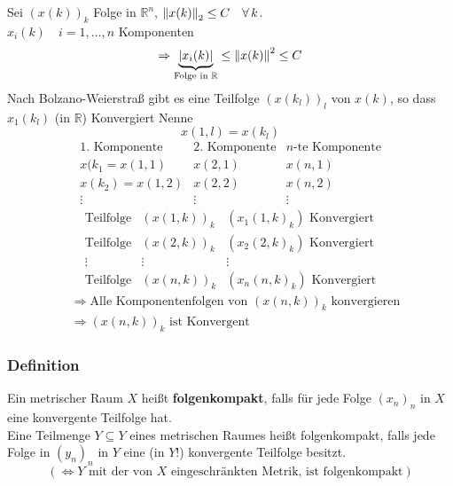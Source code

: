 Sei $(x(k))_k$ Folge in $\mathbb{R}^n$, $\norm{x(k)}_2 \leq C \quad  \forall\, k$. \\
$x_i(k) \quad  i=1,\dots,n$ Komponenten
\[
	\Rightarrow \underset{\text{Folge in } \mathbb{R}}{\underbrace{\abs{x_i(k)}}} \leq \norm{x(k)}^2 \leq C
\]
Nach Bolzano-Weierstraß gibt es eine Teilfolge $(x(k_l))_l$ von $x(k)$, so dass $x_1(k_l)$ (in $\mathbb{R}$) Konvergiert
Nenne \[
	x(1,l)=x(k_l)
\]
\[
\begin{matrix}
	\text{1. Komponente} & \text{2. Komponente} & \text{$n$-te Komponente} \\
	x(k_1=x(1,1) & x(2,1) & x(n,1) \\
	x(k_2)=x(1,2) & x(2,2) & x(n,2) \\
	\vdots & \vdots & \vdots 
\end{matrix}
\]
\[
	\begin{matrix}
		\text{Teilfolge} & (x(1,k))_k & (x_1(1,k)_k) \text{ Konvergiert} \\
		\text{Teilfolge} & (x(2,k))_k & (x_2(2,k)_k) \text{ Konvergiert} \\
		\vdots & \vdots & \vdots \\
		\text{Teilfolge} & (x(n,k))_k & (x_n(n,k)_k) \text{ Konvergiert}
	\end{matrix}
\]
\begin{align*}
	&\Rightarrow \text{Alle Komponentenfolgen von } (x(n,k))_k \text{ konvergieren} \\
	&\Rightarrow (x(n,k))_k \text{ ist Konvergent}
\end{align*}
\bewende
\subsubsection{Definition} %
\label{ssub:definition}
Ein metrischer Raum $X$ heißt {\bfseries folgenkompakt}, falls für jede Folge $(x_n)_n$ in $X$ eine konvergente Teilfolge hat. \\
Eine Teilmenge $Y \subseteq Y$ eines metrischen Raumes heißt folgenkompakt, falls jede Folge in $(y_n)_n$ in $Y$ eine (in $Y$!) konvergente Teilfolge besitzt.
\[
	( \Leftrightarrow Y \text{ mit der von $X$ eingeschränkten Metrik, ist folgenkompakt} )
\]

